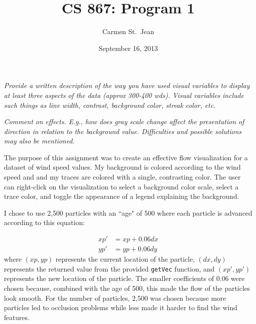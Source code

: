 \documentclass{article} %
\providecommand{\inlinecode}[1]{\texttt{#1}}
\begin{document}
\title{CS 867: Program 1}
\date{September 16, 2013}
\author{Carmen St.\ Jean}

\maketitle

\textit{Provide a written description of the way you have used visual variables to display at least three aspects of the data (approx 300-400 wds). Visual variables include such things as line width, contrast, background color, streak color, etc.}

\textit{Comment on effects. E.g., how does gray scale change affect the presentation of direction in relation to the background value. Difficulties and possible solutions may also be mentioned.}

\vspace{5 mm}

The purpose of this assignment was to create an effective flow visualization for a dataset of wind speed values.  My background is colored according to the wind speed and and my traces are colored with a single, contrasting color.  The user can right-click on the visualization to select a background color scale, select a trace color, and toggle the appearance of a legend explaining the background.

I chose to use 2,500 particles with an ``age" of 500 where each particle is advanced according to this equation:

\begin{align*} 
xp' &= xp + 0.06 dx \\
yp' &= yp + 0.06 dy
\end{align*}
where $(xp, yp)$ represents the current location of the particle, $(dx, dy)$ represents the returned value from the provided \inlinecode{getVec} function, and $(xp', yp')$ represents the new location of the particle.  The smaller coefficients of 0.06 were chosen because, combined with the age of 500, this made the flow of the particles look smooth.  For the number of particles, 2,500 was chosen because more particles led to occlusion problems while less made it harder to find the wind features.
\end{document}
